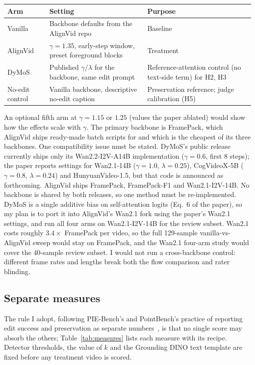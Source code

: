 \documentclass[10pt,a4paper]{article}
\begin{document}
\begin{center}\small
\begin{tabular}{@{}p{3cm}p{6.6cm}p{5.6cm}@{}}
\toprule
Arm & Setting & Purpose \\
\midrule
Vanilla & Backbone defaults from the AlignVid repo & Baseline \\
AlignVid & $\gamma = 1.35$, early-step window, preset foreground blocks & Treatment \\
DyMoS & Published $\gamma/\lambda$ for the backbone, same edit prompt & Reference-attention control (no text-side term) for H2, H3 \\
No-edit control & Vanilla backbone, descriptive no-edit caption & Preservation reference; judge calibration (H5) \\
\bottomrule
\end{tabular}
\end{center}

An optional fifth arm at $\gamma = 1.15$ or $1.25$ (values the paper ablated) would show how the effects scale with $\gamma$. The primary backbone is FramePack, which AlignVid ships ready-made batch scripts for and which is the cheapest of its three backbones. One compatibility issue must be stated. DyMoS's public release currently ships only its Wan2.2-I2V-A14B implementation ($\gamma = 0.6$, first 8 steps); the paper reports settings for Wan2.1-14B ($\gamma = 1.0$, $\lambda = 0.25$), CogVideoX-5B ($\gamma = 0.8$, $\lambda = 0.24$) and HunyuanVideo-1.5, but that code is announced as forthcoming. AlignVid ships FramePack, FramePack-F1 and Wan2.1-I2V-14B. No backbone is shared by both releases, so one method must be re-implemented. DyMoS is a single additive bias on self-attention logits (Eq.~6 of the paper), so my plan is to port it into AlignVid's Wan2.1 fork using the paper's Wan2.1 settings, and run all four arms on Wan2.1-I2V-14B for the review subset. Wan2.1 costs roughly $3.4\times$ FramePack per video, so the full 129-sample vanilla-vs-AlignVid sweep would stay on FramePack, and the Wan2.1 four-arm study would cover the 40-sample review subset. I would not run a cross-backbone control: different frame rates and lengths break both the flow comparison and rater blinding.

\subsection{Separate measures}

The rule I adopt, following PIE-Bench's and PointBench's practice of reporting edit success and preservation as separate numbers~\cite{piebench,point2insert}, is that no single score may absorb the others; Table~\ref{tab:measures} lists each measure with its recipe. Detector thresholds, the value of $k$ and the Grounding DINO text template are fixed before any treatment video is scored.
\end{document}
